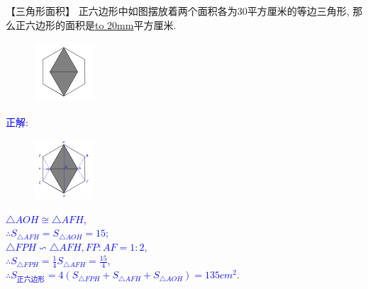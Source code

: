 \item {
    【三角形面积】
    正六边形中如图摆放着两个面积各为30平方厘米的等边三角形, 那么正六边形的面积是\underline{\hbox to 20mm{}}平方厘米.
    \begin{figure}[H] 
        \centering
        \includegraphics[width=0.2\textwidth]{./pics/Chapter_2/18.png}
    \end{figure}
    \ifshowSolution 
        \fangsong{}\textcolor{blue}{
            正解: \\
            \begin{figure}[H] 
                \centering
                \includegraphics[width=0.2\textwidth]{./pics/Chapter_2/seikai_18.png}
            \end{figure}
            $\triangle AOH \cong \triangle AFH$, \\
            $\therefore S_{\triangle AFH} = S_{\triangle AOH}= 15;$  \\
            $\triangle FPH \backsim \triangle AFH, FP:AF=1:2,$ \\
            $\therefore S_{\triangle FPH} = \frac14 S_{\triangle AFH} = \frac{15}{4}$,\\
            $\therefore S_{正六边形} = 4(S_{\triangle FPH} + S_{\triangle AFH} + S_{\triangle AOH}) = 135 {cm}^2$.
        }
    \else
        \vspace{1cm}
    \fi
}

